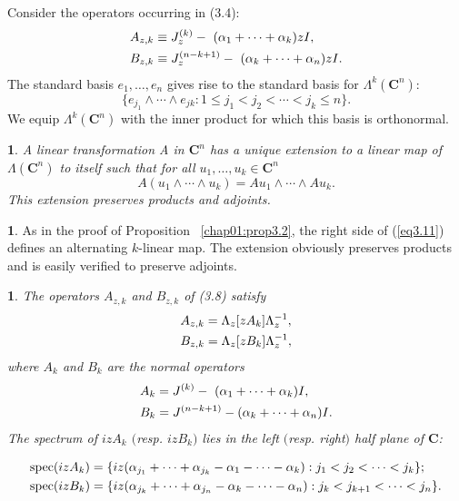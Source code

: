 \documentclass{surv-l}
\theoremstyle{plain}
\newtheorem{prop}[theorem]{\sc{Proposition}}
\newtheorem{lemma}[theorem]{\sc{Lemma}}
\theoremstyle{definition}
\newtheorem*{pf}{\sc{Proof}}
\numberwithin{equation}{chapter}
\begin{document}
Consider the operators occurring in (3.4):
\begin{align}\label{eq3.8}
&A_{z,k}\equiv J_{z}^{(k)}-\ (\alpha_{1}+\cdots +\alpha_{k})zI,\\ \notag
&B_{z,k}\equiv J_{z}^{(n-k+1)}-\ (\alpha_{k}+\cdots +\alpha_{n})zI.
\end{align}
The standard basis $e_{1},\ldots,e_{n}$ gives rise to the standard basis for $\Lambda^{k}(\mathbf{C}^{n})$:
\begin{equation}\label{eq3.9}
\{e_{j_{1}}\wedge\cdots\wedge e_{jk}:1\leq j_{1}< j_{2}<\cdots <j_{k}\leq n\}.
\end{equation}
We equip $\Lambda^{k}(\mathbf{C}^{n})$ with the inner product for which this basis is orthonormal.
\setcounter{theorem}{9}
\begin{prop}\label{chap01:prop3.10}
A linear transformation A in $\mathbf{C}^{n}$ has a unique extension to a linear map of $\Lambda(\mathbf{C}^{n})$ to itself such that for all $ u_{1},\ldots, u_{k}\in \mathbf{C}^{n}$
\setcounter{equation}{10}
\begin{equation}\label{eq3.11}
A(u_{1}\wedge\cdots\wedge u_{k})=Au_{1}\wedge\cdots\wedge Au_{k}.
\end{equation}
This extension preserves products and adjoints.
\end{prop}

\begin{pf}
As in the proof of Proposition ~\ref{chap01:prop3.2}, the right side of (\ref{eq3.11}) defines an alternating $k$-linear map. The extension obviously preserves products and is easily verified to preserve adjoints.
\end{pf}
\setcounter{theorem}{11}
\begin{lemma}\label{chap01:lem3.12}
The operators $A_{z,k}$ and $B_{z,k}$ of \emph{(3.8)} satisfy
\setcounter{equation}{12}
\begin{align}\label{eq3.13}
&A_{z,k}=\Lambda_{z}[zA_{k}]\Lambda_{z}^{-1},\\ \notag
&B_{z,k}=\Lambda_{z}[zB_{k}]\Lambda_{z}^{-1},
\end{align}
where $A_{k}$ and $B_{k}$ are the normal operators
\begin{align}\label{eq3.14}
&A_{k}=J^{(k)}-\ (\alpha_{1}+\cdots +\alpha_{k})I, \\ \notag
&B_{k}=J^{(n-k+1)}-(\alpha_{k}+\cdots +\alpha_{n})I.
\end{align}
The spectrum of $izA_{k}$ $($resp. $izB_{k})$ lies in the left $($resp. right$)$ half plane of $\mathbf{C}$\emph{:}
\end{lemma}
\begin{align}\label{eq3.15}
&\mathrm{spec}(izA_{k})=\{iz(\alpha_{j_{1}}+\cdots +\alpha_{j_{k}}-\alpha_{1}-\cdots -\alpha_{k}):j_{1}<j_{2}<\cdots <j_{k}\}; \\ \notag
&\mathrm{spec}(izB_{k})=\{iz(\alpha_{j_{k}}+\cdots+\alpha_{j_{n}}-\alpha_{k}-\cdots-\alpha_{n}):j_{k}<j_{k+1}<\cdots<j_{n}\}.
\end{align}
\end{document}

